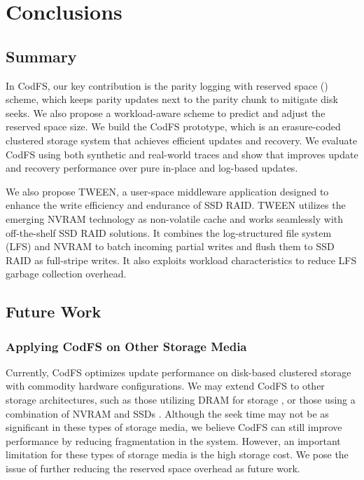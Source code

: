 \chapter{Conclusions}
\label{chap:conclusions}

\section{Summary}

In CodFS, our key contribution is the parity logging with reserved space (\PLR) scheme,
which keeps parity updates next to the parity chunk to mitigate disk seeks. We
also propose a workload-aware scheme to predict and adjust the reserved space
size.  We build the CodFS prototype, which is an erasure-coded clustered storage system
that achieves efficient updates and recovery.  We evaluate CodFS 
using both synthetic and real-world traces and show that \PLR improves update
and recovery performance over pure in-place and log-based updates.  

We also propose TWEEN, a user-space middleware application designed to enhance
the write efficiency and endurance of SSD RAID. TWEEN utilizes the emerging
NVRAM technology as non-volatile cache and works seamlessly with off-the-shelf
SSD RAID solutions. It combines the log-structured file system (LFS) and NVRAM
to batch incoming partial writes and flush them to SSD RAID as full-stripe
writes. It also exploits workload characteristics to reduce LFS garbage
collection overhead. 

\section{Future Work}

\subsection{Applying CodFS on Other Storage Media}

Currently, CodFS optimizes update performance on disk-based clustered storage
with commodity hardware configurations. We may extend CodFS to other storage
architectures, such as those utilizing DRAM for storage \cite{ongaro11}, or those using
a combination of NVRAM and SSDs \cite{qiu13}. Although the seek time may not be
as significant in these types of storage media, we believe CodFS can still
improve performance by reducing fragmentation in the system. However, an
important limitation for these types of storage media is the high storage cost.
We pose the issue of further reducing the reserved space overhead as future
work.

